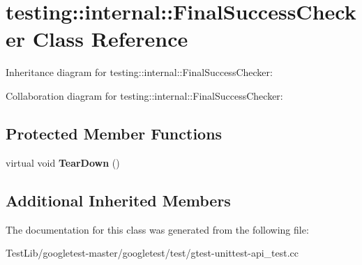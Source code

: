 \hypertarget{classtesting_1_1internal_1_1FinalSuccessChecker}{}\section{testing\+:\+:internal\+:\+:Final\+Success\+Checker Class Reference}
\label{classtesting_1_1internal_1_1FinalSuccessChecker}


Inheritance diagram for testing\+:\+:internal\+:\+:Final\+Success\+Checker\+:


Collaboration diagram for testing\+:\+:internal\+:\+:Final\+Success\+Checker\+:
\subsection*{Protected Member Functions}
\begin{DoxyCompactItemize}
\item 
\mbox{\label{classtesting_1_1internal_1_1FinalSuccessChecker_a8f39d12a1f2bfe8c6c04b5c6749382c9}} 
virtual void {\bfseries Tear\+Down} ()
\end{DoxyCompactItemize}
\subsection*{Additional Inherited Members}


The documentation for this class was generated from the following file\+:\begin{DoxyCompactItemize}
\item 
Test\+Lib/googletest-\/master/googletest/test/gtest-\/unittest-\/api\+\_\+test.\+cc\end{DoxyCompactItemize}
